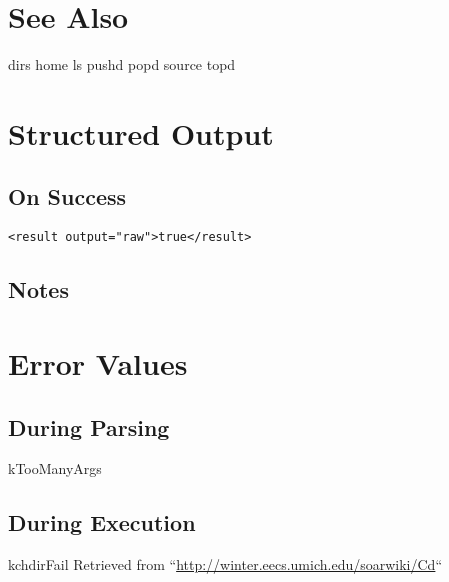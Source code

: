 \documentclass[10pt]{article}
\begin{document}
\section*{ See Also }
\begin{description}
dirs home ls pushd popd source topd

\end{description}
\section*{ Structured Output }
\subsection*{ On Success }
\begin{verbatim}
<result output="raw">true</result>

\end{verbatim}
\subsection*{ Notes }
\section*{ Error Values }
\subsection*{ During Parsing }


 kTooManyArgs
\subsection*{ During Execution }


 kchdirFail Retrieved from ``\url{http://winter.eecs.umich.edu/soarwiki/Cd}``
\end{document}
